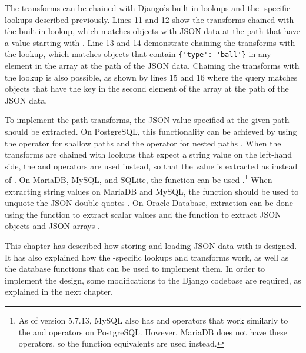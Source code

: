 The transforms can be chained with Django's built-in lookups and the
-specific lookups described previously. Lines 11 and 12 show
the transforms chained with the built-in  lookup, which
matches objects with JSON data at the path  that have a value
starting with . Line 13 and 14 demonstrate chaining the transforms
with the  lookup, which matches objects that contain
\verb|{'type': 'ball'}| in any element in the array at the path
 of the JSON data. Chaining the transforms with the
 lookup is also possible, as shown by lines 15 and 16 where the
query matches objects that have the key  in the second element of
the array at the  path of the JSON data.

To implement the path transforms, the JSON value specified at the given path
should be extracted. On PostgreSQL, this functionality can be achieved by using
the \code{->} operator for shallow paths and the \code{\#>} operator for nested
paths \cite{postgres:json_operators}. When the transforms are chained with
lookups that expect a string value on the left-hand side, the \code{->>} and
\code{\#>>} operators are used instead, so that the value is extracted as
 instead of . On MariaDB, MySQL, and SQLite, the
 function can be used \cite{mariadb:json_extract,
mysql:json_search, sqlite:json1}.\footnote{As of version 5.7.13, MySQL also has
\code{->} and \code{->>} operators that work similarly to the \code{\#>} and
\code{\#>>} operators on PostgreSQL. However, MariaDB does not have these
operators, so the function equivalents are used instead.} When extracting
string values on MariaDB and MySQL, the  function should be
used to unquote the JSON double quotes \cite{mariadb:json_unquote,
mysql:json_modify}. On Oracle Database, extraction can be done using the
 function to extract scalar values and the 
function to extract JSON objects and JSON arrays \cite{oracle:json_value,
oracle:json_query}.

This chapter has described how storing and loading JSON data with
 is designed. It has also explained how the
-specific lookups and transforms work, as well as the database
functions that can be used to implement them. In order to implement the design,
some modifications to the Django codebase are required, as explained in the
next chapter.
